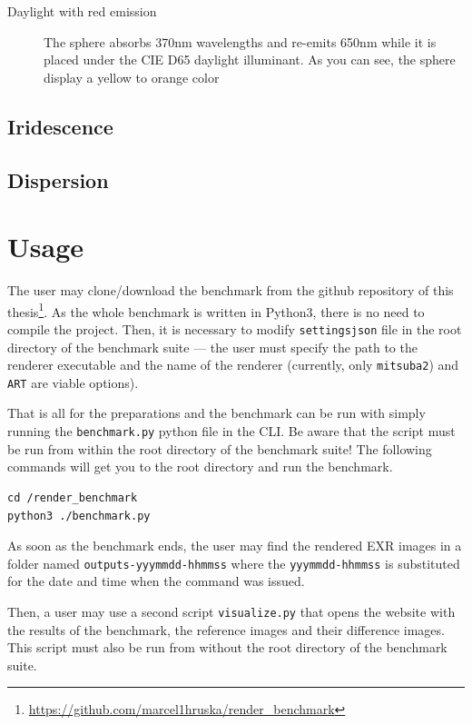 \begin{description}
	\item[Daylight with red emission] The sphere absorbs 370nm wavelengths and re-emits 650nm while it is placed under the CIE D65 daylight illuminant. As you can see, the sphere display a yellow to orange color
\end{description}

\subsection{Iridescence}

\subsection{Dispersion}
\section{Usage}

The user may clone/download the benchmark from the github repository of this thesis\footnote{\url{https://github.com/marcel1hruska/render_benchmark}}. As the whole benchmark is written in Python3, there is no need to compile the project. Then, it is necessary to modify \texttt{settings\.json} file in the root directory of the benchmark suite --- the user must specify the path to the renderer executable and the name of the renderer (currently, only \texttt{mitsuba2}) and \texttt{ART} are viable options).

That is all for the preparations and the benchmark can be run with simply running the \texttt{benchmark.py} python file in the CLI. Be aware that the script must be run from within the root directory of the benchmark suite! The following commands will get you to the root directory and run the benchmark.

\begin{lstlisting}
cd /render_benchmark
python3 ./benchmark.py
\end{lstlisting}

As soon as the benchmark ends, the user may find the rendered EXR images in a folder named \texttt{outputs-yyymmdd-hhmmss} where the \texttt{yyymmdd-hhmmss} is substituted for the date and time when the command was issued.

Then, a user may use a second script \texttt{visualize.py} that opens the website with the results of the benchmark, the reference images and their difference images. This script must also be run from without the root directory of the benchmark suite.

